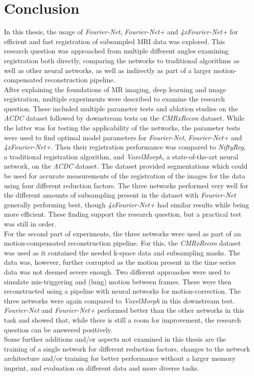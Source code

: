 
\chapter{Conclusion} \label{Ch:Conclusion}
In this thesis, the usage of \emph{Fourier-Net}, \emph{Fourier-Net+} and \emph{4xFourier-Net+} for efficient and fast registration of subsampled MRI data was explored. This research question was approached from multiple different angles examining registration both directly, comparing the networks to traditional algorithms as well as other neural networks, as well as indirectly as part of a larger motion-compensated reconstruction pipeline. \\
After explaining the foundations of MR imaging, deep learning and image registration, multiple experiments were described to examine the research question. These included multiple parameter tests and ablation studies on the \emph{ACDC} dataset followed by downstream tests on the \emph{CMRxRecon} dataset. While the latter was for testing the applicability of the networks, the parameter tests were used to find optimal model parameters for \emph{Fourier-Net}, \emph{Fourier-Net+} and \emph{4xFourier-Net+}. Then their registration performance was compared to \emph{NiftyReg}, a traditional registration algorithm, and \emph{VoxelMorph}, a state-of-the-art neural network, on the \emph{ACDC} dataset. The dataset provided segmentations which could be used for accurate measurements of the registration of the images for the data using four different reduction factors. The three networks performed very well for the different amounts of subsampling present in the dataset with \emph{Fourier-Net} generally performing best, though \emph{4xFourier-Net+} had similar results while being more efficient. These finding support the research question, but a practical test was still in order.\\
For the second part of experiments, the three networks were used as part of an motion-compensated reconstruction pipeline. For this, the \emph{CMRxRecon} dataset was used as it contained the needed k-space data and subsampling masks. The data was, however, further corrupted as the motion present in the time series data was not deemed severe enough. Two different approaches were used to simulate mis-triggering and (lung) motion between frames. These were then reconstructed using a pipeline with neural networks for motion-correction. The three networks were again compared to \emph{VoxelMorph} in this downstream test. \emph{Fourier-Net} and \emph{Fourier-Net+} performed better than the other networks in this task and showed that, while there is still a room for improvement, the research question can be answered positively.\\
Some further additions and/or aspects not examined in this thesis are the training of a single network for different reduction factors, changes to the network architecture and/or training for better performance without a larger memory imprint, and evaluation on different data and more diverse tasks.